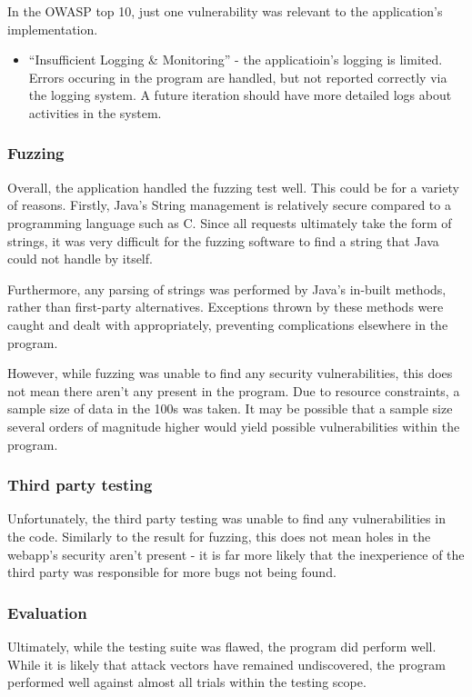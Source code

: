 In the OWASP top 10, just one vulnerability was relevant to the application's implementation.

\begin{itemize}

    \item ``Insufficient Logging \& Monitoring'' - the applicatioin's logging is limited. Errors occuring in the program are handled, but not reported correctly via the logging system. A future iteration should have more detailed logs about activities in the system.

\end{itemize}

\subsubsection{Fuzzing}

Overall, the application handled the fuzzing test well. This could be for a variety of reasons. Firstly, Java's String management is relatively secure compared to a programming language such as C. Since all requests ultimately take the form of strings, it was very difficult for the fuzzing software to find a string that Java could not handle by itself.

Furthermore, any parsing of strings was performed by Java's in-built methods, rather than first-party alternatives. Exceptions thrown by these methods were caught and dealt with appropriately, preventing complications elsewhere in the program.

However, while fuzzing was unable to find any security vulnerabilities, this does not mean there aren't any present in the program. Due to resource constraints, a sample size of data in the 100s was taken. It may be possible that a sample size several orders of magnitude higher would yield possible vulnerabilities within the program. 

\subsubsection{Third party testing}

Unfortunately, the third party testing was unable to find any vulnerabilities in the code. Similarly to the result for fuzzing, this does not mean holes in the webapp's security aren't present - it is far more likely that the inexperience of the third party was responsible for more bugs not being found.

\subsubsection{Evaluation}

Ultimately, while the testing suite was flawed, the program did perform well. While it is likely that attack vectors have remained undiscovered, the program performed well against almost all trials within the testing scope.